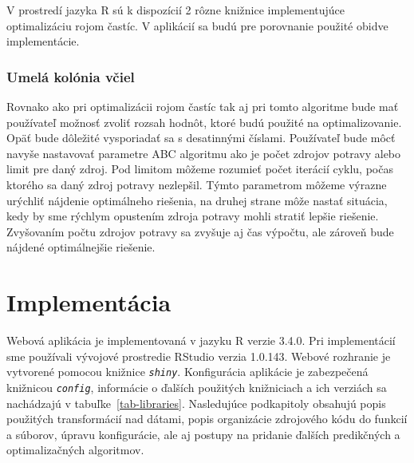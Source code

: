 \documentclass[a4paper,slovak,12pt,appendix]{article}
\begin{document}
V prostredí jazyka R sú k dispozícií 2 rôzne knižnice implementujúce
optimalizáciu rojom častíc. V aplikácií sa budú pre porovnanie použité obidve
implementácie.

\subsubsection{Umelá kolónia včiel}
Rovnako ako pri optimalizácii rojom častíc tak aj pri tomto algoritme bude mať
používateľ možnosť zvoliť rozsah hodnôt, ktoré budú použité na optimalizovanie.
Opäť bude dôležité vysporiadať sa s desatinnými číslami. Používateľ bude môcť
navyše nastavovať parametre ABC algoritmu ako je počet zdrojov potravy alebo
limit pre daný zdroj. Pod limitom môžeme rozumieť počet iterácií cyklu, počas
ktorého sa daný zdroj potravy nezlepšil. Týmto parametrom môžeme výrazne
urýchliť nájdenie optimálneho riešenia, na druhej strane môže nastať situácia,
kedy by sme rýchlym opustením zdroja potravy mohli stratiť lepšie riešenie.
Zvyšovaním počtu zdrojov potravy sa zvyšuje aj čas výpočtu, ale zároveň bude
nájdené optimálnejšie riešenie.


\newpage
\section{Implementácia}
\label{implementation}
Webová aplikácia je implementovaná v jazyku R verzie 3.4.0. Pri implementácií
sme používali vývojové prostredie RStudio verzia 1.0.143. Webové rozhranie je
vytvorené pomocou knižnice \texttt{\textit{shiny}}. Konfigurácia aplikácie je zabezpečená
knižnicou \texttt{\textit{config}}, informácie o ďalších použitých knižniciach a ich verziách
sa nachádzajú v tabuľke~\ref{tab-libraries}. Nasledujúce podkapitoly obsahujú
popis použitých transformácií nad dátami, popis organizácie zdrojového kódu
do funkcií a súborov, úpravu konfigurácie, ale aj postupy na pridanie ďalších
predikčných a optimalizačných algoritmov.
\end{document}
